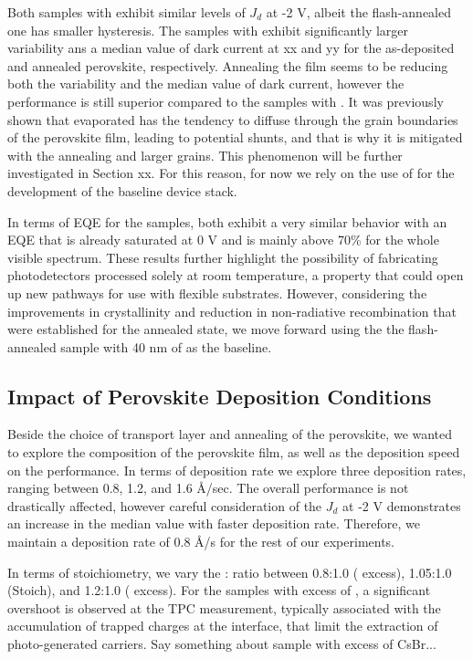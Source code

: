 Both samples with  exhibit similar levels of $J_d$ at -2 V, albeit the flash-annealed one has smaller hysteresis. The samples with  exhibit significantly larger variability ans a median value of dark current at xx and yy for the as-deposited and annealed perovskite, respectively. Annealing the film seems to be reducing both the variability and the median value of dark current, however the performance is still superior compared to the samples with . It was previously shown that evaporated  has the tendency to diffuse through the grain boundaries of the perovskite film, leading to potential shunts, and that is why it is mitigated with the annealing and larger grains. This phenomenon will be further investigated in Section xx. For this reason, for now we rely on the use of  for the development of the baseline device stack. 

In terms of EQE for the  samples, both exhibit a very similar behavior with an EQE that is already saturated at 0 V and is mainly above 70\% for the whole visible spectrum. These results further highlight the possibility of fabricating photodetectors processed solely at room temperature, a property that could open up new pathways for use with flexible substrates. However, considering the improvements in crystallinity and reduction in non-radiative recombination that were established for the annealed state, we move forward using the the flash-annealed sample with 40 nm of  as the baseline. 


\subsection{Impact of Perovskite Deposition Conditions}

Beside the choice of transport layer and annealing of the perovskite, we wanted to explore the composition of the perovskite film, as well as the deposition speed on the performance. In terms of deposition rate we explore three deposition rates, ranging between 0.8, 1.2, and 1.6 {\AA}/sec. The overall performance is not drastically affected, however careful consideration of the $J_d$ at -2 V demonstrates an increase in the median value with faster deposition rate. Therefore, we maintain a deposition rate of 0.8 {\AA}/s for the rest of our experiments. 

In terms of stoichiometry, we vary the : ratio between 0.8:1.0 ( excess), 1.05:1.0 (Stoich), and 1.2:1.0 ( excess). For the samples with excess of , a significant overshoot is observed at the TPC measurement, typically associated with the accumulation of trapped charges at the interface, that limit the extraction of photo-generated carriers. Say something about sample with excess of CsBr...


